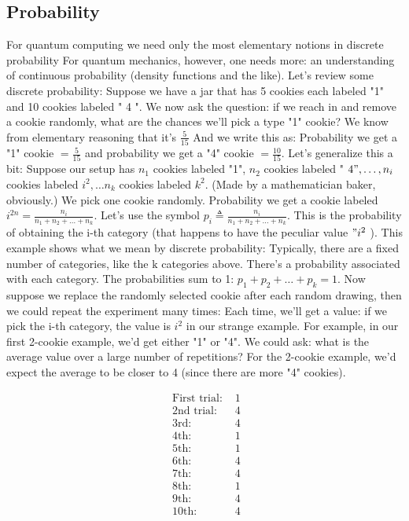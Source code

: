 \documentclass[main.tex]{subfiles}
\begin{document}
\subsection{Probability}

For quantum computing we need only the most elementary notions in discrete probability For quantum mechanics, however, one needs more: an understanding of continuous probability (density functions and the like). Let's review some discrete probability: Suppose we have a jar that has 5 cookies each labeled "1" and 10 cookies labeled " 4 ". We now ask the question: if we reach in and remove a cookie randomly, what are the chances we'll pick a type "1" cookie? We know from elementary reasoning that it's $\frac{5}{15}$ And we write this as: Probability we get a "1" cookie $=\frac{5}{15}$ and probability we get a "4" cookie $=\frac{10}{15}$. Let's generalize this a bit: Suppose our setup has $n_{1}$ cookies labeled "1", $n_{2}$ cookies labeled " $4 ", \ldots, n_{i}$ cookies labeled $i^{2}, \ldots n_{k}$ cookies labeled $k^{2}$. (Made by a mathematician baker, obviously.) We pick one cookie randomly. Probability we get a cookie labeled $i^{2 n}=\frac{n_{i}}{n_{1}+n_{2}+\ldots+n_{k}}$. Let's use the symbol $p_{i} \triangleq \frac{n_{i}}{n_{1}+n_{2}+\ldots+n_{k}}$. This is the probability of obtaining the i-th category (that happens to have the peculiar value $" i^{2}$ ). This example shows what we mean by discrete probability: Typically, there are a fixed number of categories, like the $\mathrm{k}$ categories above. There's a probability associated with each category. The probabilities sum to 1: $p_{1}+p_{2}+\ldots+p_{k}=1$. Now suppose we replace the randomly selected cookie after each random drawing, then we could repeat the experiment many times: Each time, we'll get a value: if we pick the i-th category, the value is $i^{2}$ in our strange example. For example, in our first 2-cookie example, we'd get either "1" or "4". We could ask: what is the average value over a large number of repetitions? For the 2-cookie example, we'd expect the average to be closer to 4 (since there are more "4" cookies).

$$
\begin{array}{ll}
\text { First trial: } & 1 \\
\text { 2nd trial: } & 4 \\
\text { 3rd: } & 4 \\
\text { 4th: } & 1 \\
\text { 5th: } & 1 \\
\text { 6th: } & 4 \\
\text { 7th: } & 4 \\
\text { 8th: } & 1 \\
\text { 9th: } & 4 \\
\text { 10th: } & 4
\end{array}
$$
\end{document}
